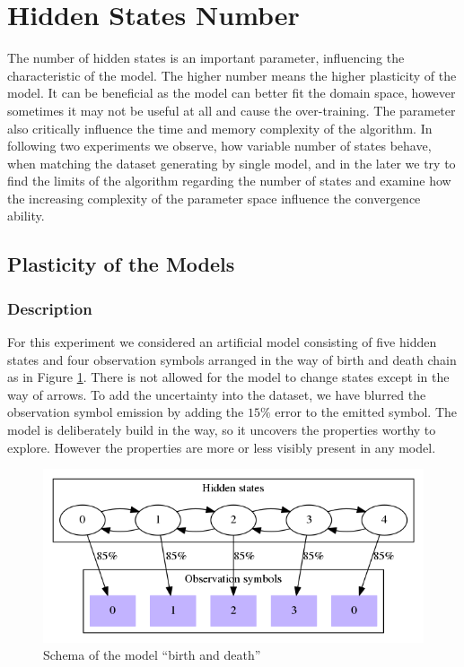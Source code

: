 \documentclass[thesis=M,english]{FITthesis}[2012/10/20]
\begin{document}
\section{Hidden States Number}\label{sec:hsn}

The number of hidden states is an important parameter, influencing the characteristic of the model. The higher number means the higher plasticity of the model. It can be beneficial as the model can better fit the domain space, however sometimes it may not be useful at all and cause the over-training. The parameter also critically influence the time and memory complexity of the algorithm. In following two experiments we observe, how variable number of states behave, when matching the dataset generating by single model, and in the later we try to find the limits of the algorithm regarding the number of states and examine how the increasing complexity of the parameter space influence the convergence ability.    

\subsection{Plasticity of the Models}\label{sec:plast}

\subsubsection*{ Description }
For this experiment we considered an artificial model consisting of five hidden states and four observation symbols arranged in the way of birth and death chain as in Figure \ref{fig:db}. There is not allowed for the model to change states except in the way of arrows. To add the uncertainty into the dataset, we have blurred the observation symbol emission by adding the $15\%$ error to the emitted symbol. The model is deliberately build in the way, so it uncovers the properties worthy to explore. However the properties are more or less visibly present in any model. 


\begin{figure}
\centering
\includegraphics[width=1\linewidth]{img/ex5/hs.png}
\caption{Schema of the model ``birth and death'' }
\label{fig:db}
\end{figure}
 
\end{document}
